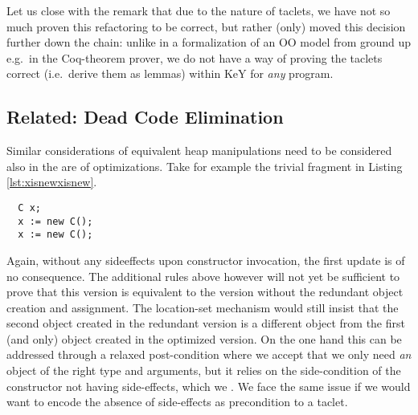 Let us close with the remark that due to the nature of taclets, we have not so much proven this refactoring to be correct,
but rather (only) moved this decision further down the chain: unlike in a formalization of an OO model from ground up e.g.\ in the Coq-theorem prover,
we do not have a way of proving the taclets correct (i.e.\ derive them as lemmas) within KeY for \textit{any} program.

\subsection*{Related: Dead Code Elimination}
Similar considerations of equivalent heap manipulations need to be considered also in the are of optimizations.
Take for example the trivial fragment in Listing \ref{lst:xisnewxisnew}.
\begin{lstlisting}
  C x;
  x := new C();
  x := new C();
\end{lstlisting}
Again, without any sideeffects upon constructor invocation, the first update is of no consequence.
The additional rules above however will not yet be sufficient to prove that this version is equivalent to the version without the redundant object creation and assignment.
The location-set mechanism would still insist that the second object created  in the redundant version is a different object from the first (and only) object created in the optimized version.
On the one hand this can be addressed through a relaxed post-condition where we accept that we only need \textit{an} object of the right type and arguments, but it relies on the side-condition of the constructor not having side-effects, which we .
We face the same issue if we would want to encode the absence of side-effects as precondition to a taclet.

